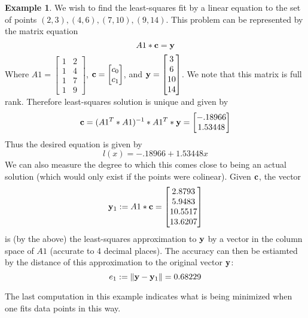 \documentclass[11pt,notitlepage]{article}
\numberwithin{equation}{section}
\theoremstyle{plain}
\theoremstyle{definition}
\newtheorem{example}[equation]{Example}
\begin{document}
\begin{example} We wish to find the least-squares fit by a linear equation to the set of points $(2,3), (4,6), (7,10), (9,14)$. This problem can be represented by the matrix equation
\[
A1*{\bf c} = {\bf y}
\]
Where $A1 = \begin{bmatrix} 1 & 2\\1 & 4\\1 & 7\\1 & 9\end{bmatrix}$, ${\bf c} = \begin{bmatrix}c_0\\c_1\end{bmatrix}$, and ${\bf y} = \begin{bmatrix} 3\\6\\10\\14\end{bmatrix}$. We note that this matrix is full rank. Therefore least-squares solution is unique and given by
\[
{\bf c} = (A1^T*A1)^{-1}*A1^T*{\bf y} = \begin{bmatrix}-.18966\\ 1.53448\end{bmatrix}
\]
Thus the desired equation is given by
\[
l(x) = -.18966 + 1.53448 x
\]
We can also measure the degree to which this comes close to being an actual solution (which would only exist if the points were colinear). Given $\bf c$, the vector
\[
{\bf y}_1 := A1*{\bf c} = \begin{bmatrix} 2.8793\\ 5.9483\\ 10.5517\\ 13.6207\end{bmatrix}
\]
is (by the above) the least-squares approximation to $\bf y$ by a vector in the column space of $A1$ (accurate to 4 decimal places). The accuracy can then be estiamted by the distance of this approximation to the original vector $\bf y$:
\[
e_1 := \|{\bf y} - {\bf y}_1\| = 0.68229
\]
\end{example}

The last computation in this example indicates what is being minimized when one fits data points in this way. 
\end{document}

